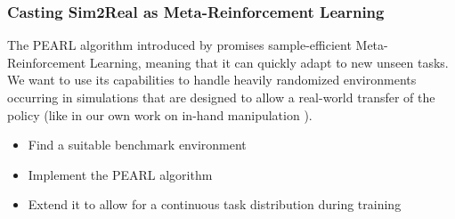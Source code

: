 \documentclass[a4paper]{article}
\begin{document}




\subsubsection{Casting Sim2Real as Meta-Reinforcement Learning}
The PEARL algorithm introduced by \citet{rakelly2019} promises sample-efficient Meta-Reinforcement Learning, meaning that it can quickly adapt to new unseen tasks. We want to use its capabilities to handle heavily randomized environments occurring in simulations that are designed to allow a real-world transfer of the policy (like in our own work on in-hand manipulation \citet{sievers2021}).
\begin{itemize}
  \item Find a suitable benchmark environment
  \item Implement the PEARL algorithm
  \item Extend it to allow for a continuous task distribution during training
\end{itemize}









\end{document}
